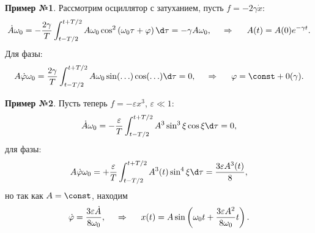 \textbf{Пример №1}. Рассмотрим осциллятор с затуханием, пусть $f = - 2 \gamma \dot{x}$:
\begin{equation*}
    \dot{A} \omega_0 = - \frac{2 \gamma}{T} \int_{t-T/2}^{t+T/2} 
        A \omega_0 \cos^2 \left(\omega_0 \tau + \varphi\right)
     \d \tau = - \gamma A \omega_0,
     \hspace{0.5cm} \Rightarrow \hspace{0.5cm}
     A(t) = A(0) e^{- \gamma t}.
\end{equation*}
Для фазы:
\begin{equation*}
    A \dot{\varphi} \omega_0 = \frac{2 \gamma}{T} \int_{t-T/2}^{t+T/2} A \omega_0 \sin (\ldots) \cos (\ldots) \d \tau = 0,
    \hspace{0.5cm} \Rightarrow \hspace{0.5cm}
    \varphi = \const + 0(\gamma).
\end{equation*}


\textbf{Пример №2}. Пусть теперь $f = - \varepsilon x^3$, $\varepsilon \ll 1$:
\begin{equation*}
    \dot{A} \omega_0 = - \frac{\varepsilon}{T} \int_{t-T/2}^{t+T/2} A^3 \sin^3 \xi \cos \xi \d \tau = 0,
\end{equation*}
для фазы:
\begin{equation*}
    A \dot{\varphi} \omega_0 = + \frac{\varepsilon}{T} \int_{t-T/2}^{t+T/2} A^3(t) \sin^4 \xi \d \tau = \frac{3 \varepsilon A^3(t)}{8},
\end{equation*}
но так как $A = \const$, находим
\begin{equation*}
    \dot{\varphi} = \frac{3 \varepsilon \dot{A}}{8 \omega_0},
    \hspace{0.5cm} \Rightarrow \hspace{0.5cm}
    x(t) =  A \sin \left(\omega_0 t + \frac{3 \varepsilon A^2}{8 \omega_0} t\right).
\end{equation*}


